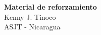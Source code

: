 \begin{center}
{
    \textbf{\Large Material de reforzamiento} \vspace{5mm} \\
    {\large Kenny J. Tinoco} \vspace{3mm} \\
    ASJT - Nicaragua
}
\end{center}

\thispagestyle{first-page-style}